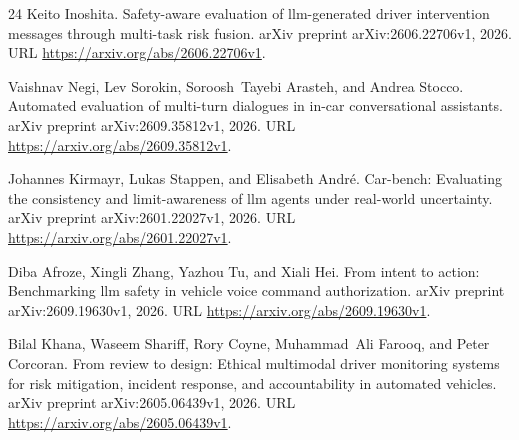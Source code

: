 \documentclass[11pt,a4paper]{article}
\begin{document}
\begin{thebibliography}{24}
Keito Inoshita.
\newblock Safety-aware evaluation of llm-generated driver intervention messages
  through multi-task risk fusion.
\newblock arXiv preprint arXiv:2606.22706v1, 2026.
\newblock URL \url{https://arxiv.org/abs/2606.22706v1}.

Vaishnav Negi, Lev Sorokin, Soroosh~Tayebi Arasteh, and Andrea Stocco.
\newblock Automated evaluation of multi-turn dialogues in in-car conversational
  assistants.
\newblock arXiv preprint arXiv:2609.35812v1, 2026.
\newblock URL \url{https://arxiv.org/abs/2609.35812v1}.

Johannes Kirmayr, Lukas Stappen, and Elisabeth André.
\newblock Car-bench: Evaluating the consistency and limit-awareness of llm
  agents under real-world uncertainty.
\newblock arXiv preprint arXiv:2601.22027v1, 2026{}.
\newblock URL \url{https://arxiv.org/abs/2601.22027v1}.

Diba Afroze, Xingli Zhang, Yazhou Tu, and Xiali Hei.
\newblock From intent to action: Benchmarking llm safety in vehicle voice
  command authorization.
\newblock arXiv preprint arXiv:2609.19630v1, 2026.
\newblock URL \url{https://arxiv.org/abs/2609.19630v1}.

Bilal Khana, Waseem Shariff, Rory Coyne, Muhammad~Ali Farooq, and Peter
  Corcoran.
\newblock From review to design: Ethical multimodal driver monitoring systems
  for risk mitigation, incident response, and accountability in automated
  vehicles.
\newblock arXiv preprint arXiv:2605.06439v1, 2026.
\newblock URL \url{https://arxiv.org/abs/2605.06439v1}.

\end{thebibliography}
\end{document}
